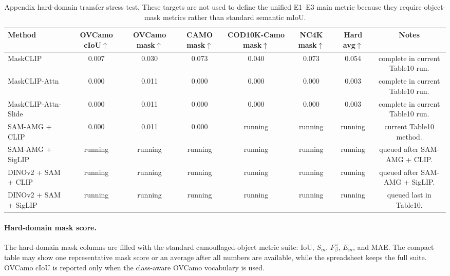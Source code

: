 \documentclass[11pt,a4paper]{article}
\newcommand{\up}{\ensuremath{\uparrow}}
\begin{document}
\begin{table}[H]
\centering
\scriptsize
\caption{Appendix hard-domain transfer stress test. These targets are not used to define the unified E1--E3 main metric because they require object-mask metrics rather than standard semantic mIoU.}
\label{tab:appendix-hard-domain}
\begin{adjustbox}{max width=\textwidth}
\begin{tabular}{l c c c c c c c}
\toprule
Method & OVCamo cIoU\up & OVCamo mask\up & CAMO mask\up & COD10K-Camo mask\up & NC4K mask\up & Hard avg\up & Notes \\
\midrule
MaskCLIP & 0.007 & 0.030 & 0.073 & 0.040 & 0.073 & 0.054 & complete in current Table10 run. \\
MaskCLIP-Attn & 0.000 & 0.011 & 0.000 & 0.000 & 0.000 & 0.003 & complete in current Table10 run. \\
MaskCLIP-Attn-Slide & 0.000 & 0.011 & 0.000 & 0.000 & 0.000 & 0.003 & complete in current Table10 run. \\
SAM-AMG + CLIP & 0.000 & 0.011 & 0.000 & running & running & running & current Table10 method. \\
SAM-AMG + SigLIP & running & running & running & running & running & running & queued after SAM-AMG + CLIP. \\
DINOv2 + SAM + CLIP & running & running & running & running & running & running & queued after SAM-AMG + SigLIP. \\
DINOv2 + SAM + SigLIP & running & running & running & running & running & running & queued last in Table10. \\
\bottomrule
\end{tabular}
\end{adjustbox}
\end{table}

\paragraph{Hard-domain mask score.}
The hard-domain mask columns are filled with the standard camouflaged-object metric suite: IoU, $S_m$, $F^\omega_\beta$, $E_m$, and MAE. The compact table may show one representative mask score or an average after all numbers are available, while the spreadsheet keeps the full suite. OVCamo cIoU is reported only when the class-aware OVCamo vocabulary is used.
\end{document}
